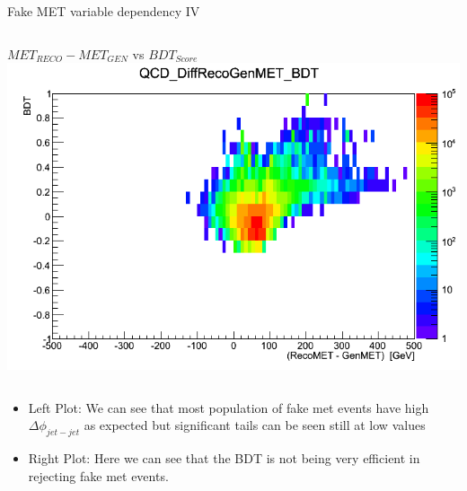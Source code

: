 \documentclass[8pt]{beamer}
\begin{document}
\begin{frame}{Fake MET variable dependency IV}
\begin{columns}
\begin{block}{$MET_{RECO}-MET_{GEN}$ vs $BDT_{Score}$}
\centering
\includegraphics[width=\linewidth]{img/QCD_DiffRecoGenMET_BDT.png} 
 
\end{block}

\end{columns}

\begin{itemize}
  \item Left Plot: We can see that most population of fake met events have high $\Delta\phi_{jet-jet}$ as expected but significant tails can be seen still at low values
  \item Right Plot: Here we can see that the BDT is not being very efficient in rejecting fake met events.
\end{itemize}

\end{frame}
\end{document}
